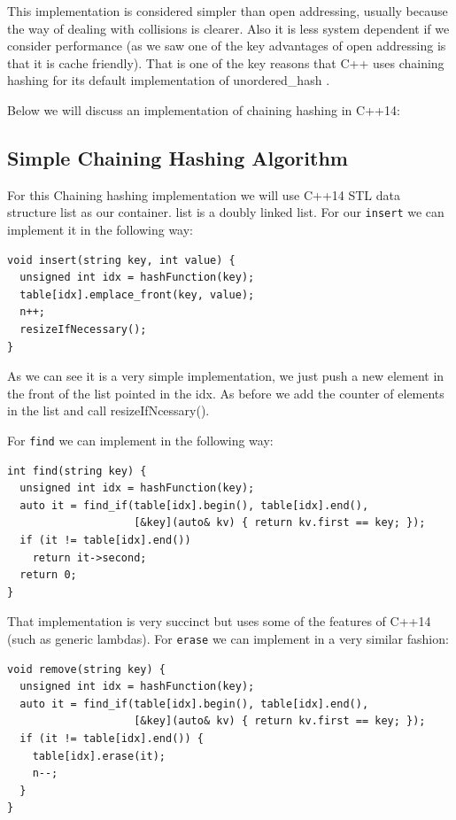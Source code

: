 This implementation is considered simpler than open addressing, usually because the way of dealing with collisions is clearer. Also it is less system dependent if we consider performance (as we saw one of the key advantages of open addressing is that it is cache friendly). That is one of the key reasons that C++ uses chaining hashing for its default implementation of unordered\_hash \citep{HashTableProposal}.

Below we will discuss an implementation of chaining hashing in C++14:

\subsection{Simple Chaining Hashing Algorithm}

For this Chaining hashing implementation we will use C++14 STL data structure list as our container. list is a doubly linked list. For our \texttt{insert} we can implement it in the following way:

\begin{lstlisting}
void insert(string key, int value) {
  unsigned int idx = hashFunction(key);      
  table[idx].emplace_front(key, value);
  n++;
  resizeIfNecessary();
}
\end{lstlisting}

As we can see it is a very simple implementation, we just push a new element in the front of the list pointed in the idx. As before we add the counter of elements in the list and call resizeIfNcessary().

For \texttt{find} we can implement in the following way:

\begin{lstlisting}
int find(string key) {
  unsigned int idx = hashFunction(key);
  auto it = find_if(table[idx].begin(), table[idx].end(),
                    [&key](auto& kv) { return kv.first == key; });
  if (it != table[idx].end())
    return it->second;
  return 0;
}
\end{lstlisting}

That implementation is very succinct but uses some of the features of C++14 (such as generic lambdas). For \texttt{erase} we can implement in a very similar fashion:

\begin{lstlisting}
void remove(string key) {
  unsigned int idx = hashFunction(key);
  auto it = find_if(table[idx].begin(), table[idx].end(),
                    [&key](auto& kv) { return kv.first == key; });
  if (it != table[idx].end()) {
    table[idx].erase(it);
    n--;
  }
}
\end{lstlisting}

